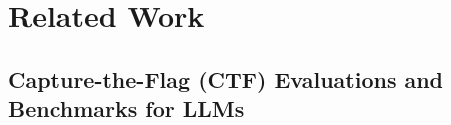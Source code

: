 \section{Related Work}
\label{sec:related_work}





\subsection{Capture-the-Flag (CTF) Evaluations and Benchmarks for LLMs} 


